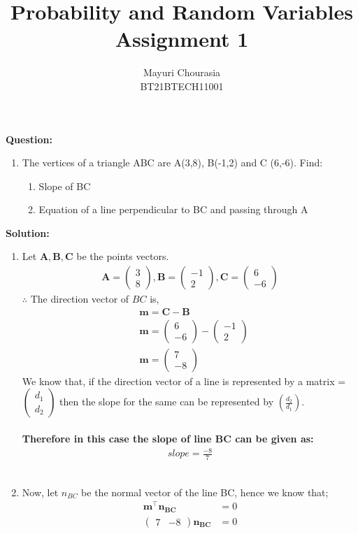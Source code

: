 \documentclass[journal,12pt,twocolumn]{IEEEtran}
\title{Probability and Random Variables\\Assignment 1}
\author{Mayuri Chourasia\\BT21BTECH11001}
\date{}
\let\vec\mathbf
\newcommand{\myvec}[1]{\ensuremath{\begin{pmatrix}#1\end{pmatrix}}}
\newcommand{\question}{\noindent \textbf{Question: }}
\newcommand{\solution}{\noindent \textbf{Solution: }}
\begin{document}
\maketitle
\question
\begin{enumerate}[label=]
\item The vertices of a triangle ABC are A(3,8), B(-1,2) and C (6,-6). Find:
\begin{enumerate}
    \item Slope of BC
    \item Equation of a line perpendicular to BC and passing through A
\end{enumerate}
\end{enumerate}
\solution
\begin{enumerate}
\item Let $\vec{A}, \vec{B}, \vec{C}$ be the points vectors.
	\begin{align}
		\vec{A} = \myvec{3 \\ 8} ,
		\vec{B} = \myvec{-1 \\ 2}  ,
		\vec{C} = \myvec{6 \\ -6}
	\end{align}
	$\therefore$ The direction vector of $BC$ is,
    \begin{align}
    &\vec{m} = \vec{C} - \vec{B}
    \\
	&\vec{m} = \myvec{6 \\ -6} - \myvec{-1 \\ 2}
	\\
	&\vec{m} = \myvec{7 \\ -8}
    \end{align}
    We know that, if the direction vector of a line is represented by a matrix \vec{m}=\myvec{d_1\\d_2} then the slope for the same can be represented by $(\frac{d_2}{d_1})$.\\
    \medskip\\
    \textbf{Therefore in this case the slope of line BC can be given as:}
    \begin{align}
        slope=\frac{-8}{7}
    \end{align}
    \medskip\\
\item Now, let $n_{BC}$ be the normal vector of the line BC, hence we know that;
    \begin{align}
	\vec{m}^{\top}\vec{n_{BC}} &= 0
	\\
	\myvec{7 & -8}\vec{n_{BC}} &= 0
	\\

\end{align}
\end{enumerate}
\end{document}
